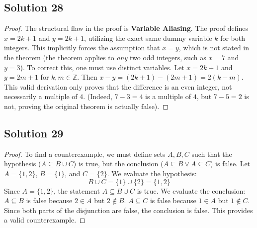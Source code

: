 \documentclass[12pt]{article}
\begin{document}
\subsection*{Solution 28}
\begin{proof}
The structural flaw in the proof is \textbf{Variable Aliasing}. The proof defines $x = 2k+1$ and $y = 2k+1$, utilizing the exact same dummy variable $k$ for both integers. This implicitly forces the assumption that $x = y$, which is not stated in the theorem (the theorem applies to \textit{any} two odd integers, such as $x=7$ and $y=3$). 
To correct this, one must use distinct variables. Let $x = 2k+1$ and $y = 2m+1$ for $k, m \in \mathbb{Z}$. Then $x - y = (2k+1) - (2m+1) = 2(k - m)$. This valid derivation only proves that the difference is an even integer, not necessarily a multiple of $4$. (Indeed, $7 - 3 = 4$ is a multiple of $4$, but $7 - 5 = 2$ is not, proving the original theorem is actually false).
\end{proof}

\subsection*{Solution 29}
\begin{proof}
To find a counterexample, we must define sets $A, B, C$ such that the hypothesis ($A \subseteq B \cup C$) is true, but the conclusion ($A \subseteq B \lor A \subseteq C$) is false. 
Let $A = \{1, 2\}$, $B = \{1\}$, and $C = \{2\}$. 
We evaluate the hypothesis:
\[ B \cup C = \{1\} \cup \{2\} = \{1, 2\} \]
Since $A = \{1, 2\}$, the statement $A \subseteq B \cup C$ is true. 
We evaluate the conclusion:
$A \subseteq B$ is false because $2 \in A$ but $2 \notin B$. 
$A \subseteq C$ is false because $1 \in A$ but $1 \notin C$. 
Since both parts of the disjunction are false, the conclusion is false. This provides a valid counterexample.
\end{proof}
\end{document}
